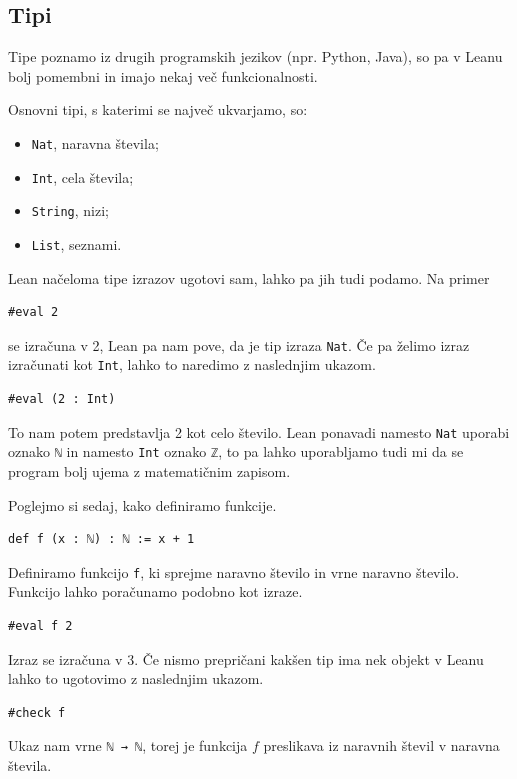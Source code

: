 \documentclass[mat1]{fmfdelo}
\begin{document}
\subsection{Tipi}
Tipe poznamo iz drugih programskih jezikov (npr. Python, Java), so pa v Leanu bolj pomembni in imajo nekaj več funkcionalnosti.

Osnovni tipi, s katerimi se največ ukvarjamo, so:
\begin{itemize}
    \item \lstinline{Nat}, naravna števila;
    \item \lstinline{Int}, cela števila;
    \item \lstinline{String}, nizi;
    \item \lstinline{List}, seznami.
\end{itemize}
Lean načeloma tipe izrazov ugotovi sam, lahko pa jih tudi podamo. Na primer
\begin{lstlisting}
#eval 2
\end{lstlisting}
se izračuna v 2, Lean pa nam pove, da je tip izraza \lstinline{Nat}. Če pa želimo izraz izračunati kot \lstinline{Int}, lahko to naredimo z naslednjim ukazom.
\begin{lstlisting}
#eval (2 : Int)
\end{lstlisting}
To nam potem predstavlja 2 kot celo število. Lean ponavadi namesto
\lstinline{Nat} uporabi oznako \lstinline{ℕ} in namesto \lstinline{Int} oznako \lstinline{ℤ}, to pa lahko uporabljamo tudi mi
da se program bolj ujema z matematičnim zapisom. 

Poglejmo si sedaj, kako definiramo funkcije.
\begin{lstlisting}
def f (x : ℕ) : ℕ := x + 1
\end{lstlisting}
Definiramo funkcijo \lstinline{f}, ki sprejme naravno število in vrne naravno število. Funkcijo lahko poračunamo podobno kot izraze.
\begin{lstlisting}
#eval f 2
\end{lstlisting}
Izraz se izračuna v 3. Če nismo prepričani kakšen tip ima nek objekt v Leanu lahko to ugotovimo z naslednjim ukazom.
\begin{lstlisting}
#check f
\end{lstlisting}
Ukaz nam vrne \lstinline{ℕ → ℕ}, torej je funkcija $f$ preslikava iz naravnih števil v naravna števila.
\end{document}
